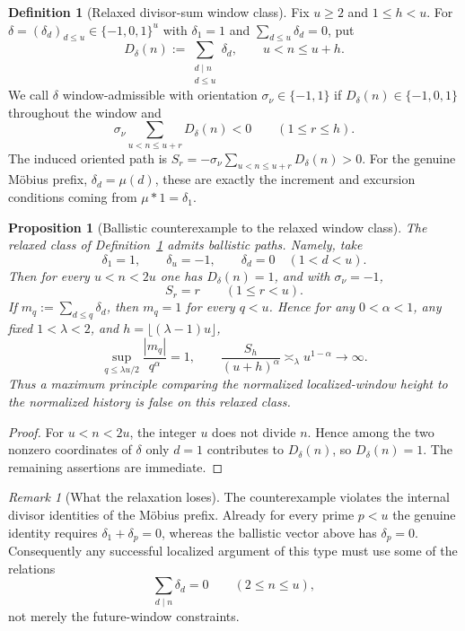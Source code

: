 \documentclass[11pt]{amsart}
\numberwithin{equation}{section}
\theoremstyle{plain}
\newtheorem{proposition}[theorem]{Proposition}
\theoremstyle{definition}
\newtheorem{definition}[theorem]{Definition}
\theoremstyle{remark}
\newtheorem{remark}[theorem]{Remark}
\begin{document}
\begin{definition}[Relaxed divisor-sum window class]
\label{def:relaxed-divisor-cone}
Fix $u\ge2$ and $1\le h<u$.  For
$\delta=(\delta_d)_{d\le u}\in\{-1,0,1\}^u$ with $\delta_1=1$ and
$\sum_{d\le u}\delta_d=0$, put
\[
D_\delta(n):=\sum_{\substack{d\mid n\\ d\le u}}\delta_d,
\qquad u<n\le u+h.
\]
We call $\delta$ window-admissible with orientation $\sigma_\nu\in\{-1,1\}$ if
$D_\delta(n)\in\{-1,0,1\}$ throughout the window and
\[
\sigma_\nu\sum_{u<n\le u+r}D_\delta(n)<0
\qquad(1\le r\le h).
\]
The induced oriented path is
$S_r=-\sigma_\nu\sum_{u<n\le u+r}D_\delta(n)>0$.
For the genuine M\"obius prefix, $\delta_d=\mu(d)$, these are exactly the
increment and excursion conditions coming from $\mu*1=\delta_1$.
\end{definition}

\begin{proposition}[Ballistic counterexample to the relaxed window class]
\label{prop:relaxed-ballistic}
The relaxed class of Definition~\ref{def:relaxed-divisor-cone} admits
ballistic paths.  Namely, take
\[
\delta_1=1,\qquad\delta_u=-1,\qquad\delta_d=0\quad(1<d<u).
\]
Then for every $u<n<2u$ one has $D_\delta(n)=1$, and with $\sigma_\nu=-1$,
\[
S_r=r\qquad(1\le r<u).
\]
If $m_q:=\sum_{d\le q}\delta_d$, then $m_q=1$ for every $q<u$.  Hence for
any $0<\alpha<1$, any fixed $1<\lambda<2$, and
$h=\lfloor(\lambda-1)u\rfloor$,
\[
\sup_{q\le\lambda u/2}\frac{|m_q|}{q^\alpha}=1,
\qquad
\frac{S_h}{(u+h)^\alpha}\asymp_\lambda u^{1-\alpha}\longrightarrow\infty.
\]
Thus a maximum principle comparing the normalized localized-window height
to the normalized history is false on this relaxed class.
\end{proposition}

\begin{proof}
For $u<n<2u$, the integer $u$ does not divide $n$.  Hence among the two
nonzero coordinates of $\delta$ only $d=1$ contributes to $D_\delta(n)$,
so $D_\delta(n)=1$.  The remaining assertions are immediate.
\end{proof}

\begin{remark}[What the relaxation loses]
\label{rem:relaxed-loses}
The counterexample violates the internal divisor identities of the M\"obius
prefix.  Already for every prime $p<u$ the genuine identity requires
$\delta_1+\delta_p=0$, whereas the ballistic vector above has
$\delta_p=0$.  Consequently any successful localized argument of this type
must use some of the relations
\[
\sum_{d\mid n}\delta_d=0\qquad(2\le n\le u),
\]
not merely the future-window constraints.
\end{remark}
\end{document}
